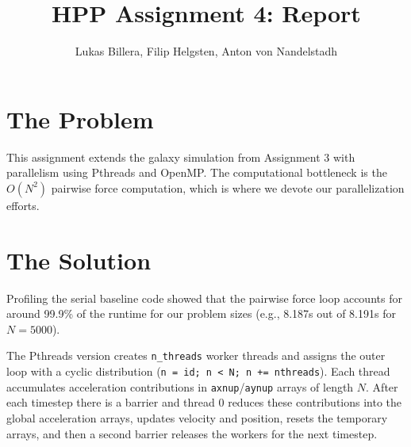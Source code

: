 \documentclass[11pt,a4paper]{article}
\title{HPP Assignment 4: Report}
\author{Lukas Billera, Filip Helgsten, Anton von Nandelstadh}
\date{}
\begin{document}
\maketitle

\section{The Problem}
This assignment extends the galaxy simulation from Assignment 3 with parallelism using
Pthreads and OpenMP. The computational bottleneck is the $O(N^2)$ pairwise force computation,
which is where we devote our parallelization efforts.

\section{The Solution}
Profiling the serial baseline code showed that the pairwise force loop accounts for around 99.9\%
of the runtime for our problem sizes (e.g., 8.187s out of 8.191s for $N = 5000$).

The Pthreads version creates \texttt{n\_threads} worker threads and assigns the outer loop with a
cyclic distribution (\texttt{n = id; n < N; n += nthreads}). Each thread accumulates acceleration
contributions in \texttt{axnup}/\texttt{aynup} arrays of length $N$. After each timestep there is a barrier and
thread 0 reduces these contributions into the global acceleration arrays, updates velocity and
position, resets the temporary arrays, and then a second barrier releases the workers for the
next timestep.
\end{document}
